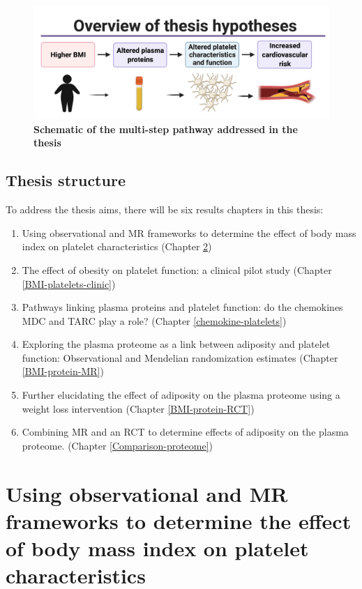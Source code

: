 \documentclass[11pt,twoside]{bristolthesis}
\providecommand{\tightlist}{%
  \setlength{\itemsep}{0pt}\setlength{\parskip}{0pt}}
\begin{document}
\begin{figure}

{\centering \includegraphics{figure/Intro_background/Thesis_graphic_overview_without_chapters} 

}

\caption[Schematic of the multi-step pathway addressed in the thesis]{\textbf{Schematic of the multi-step pathway addressed in the thesis}}\label{fig:Thesis-schematic}
\end{figure}
\hypertarget{thesis-structure}{%
\section{Thesis structure}\label{thesis-structure}}

To address the thesis aims, there will be six results chapters in this thesis:
\begin{enumerate}
\def\labelenumi{\arabic{enumi})}
\tightlist
\item
  Using observational and MR frameworks to determine the effect of body mass index on platelet characteristics (Chapter \ref{BMI-platelets-INTERVAL})
\item
  The effect of obesity on platelet function: a clinical pilot study (Chapter \ref{BMI-platelets-clinic})
\item
  Pathways linking plasma proteins and platelet function: do the chemokines MDC and TARC play a role? (Chapter \ref{chemokine-platelets})
\item
  Exploring the plasma proteome as a link between adiposity and platelet function: Observational and Mendelian randomization estimates (Chapter \ref{BMI-protein-MR})
\item
  Further elucidating the effect of adiposity on the plasma proteome using a weight loss intervention (Chapter \ref{BMI-protein-RCT})
\item
  Combining MR and an RCT to determine effects of adiposity on the plasma proteome. (Chapter \ref{Comparison-proteome})
\end{enumerate}
\hypertarget{BMI-platelets-INTERVAL}{%
\chapter{Using observational and MR frameworks to determine the effect of body mass index on platelet characteristics}\label{BMI-platelets-INTERVAL}}
\end{document}
